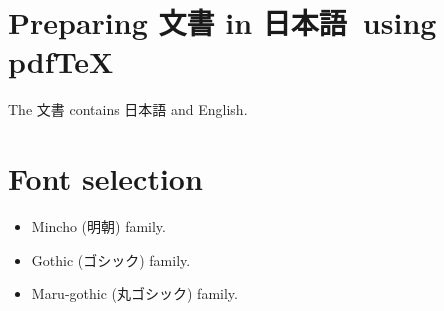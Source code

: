 \documentclass[a4paper]{article}
\newcommand\Nihongo{日本語}
\begin{document}

\section{Preparing 文書 in \Nihongo\ using pdf\TeX}
The 文書 contains 日本語 and English.

\section{Font selection}
\begin{itemize}
\item \rmfamily Mincho (明朝) family.
\item \sffamily Gothic (ゴシック) family.
\item \mgfamily Maru-gothic (丸ゴシック) family.
\end{itemize}
\end{document}
